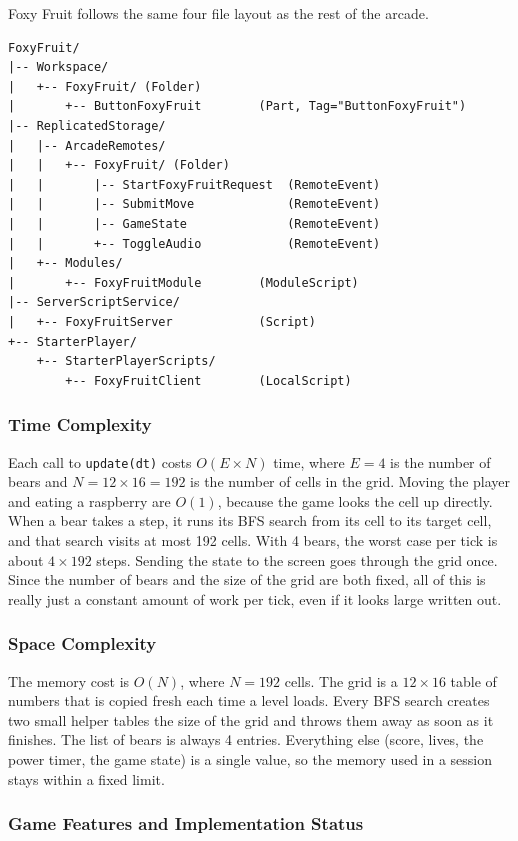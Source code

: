 \documentclass[12pt,letterpaper]{article}
\begin{document}
Foxy Fruit follows the same four file layout as the rest of the arcade.

\begin{lstlisting}
FoxyFruit/
|-- Workspace/
|   +-- FoxyFruit/ (Folder)
|       +-- ButtonFoxyFruit        (Part, Tag="ButtonFoxyFruit")
|-- ReplicatedStorage/
|   |-- ArcadeRemotes/
|   |   +-- FoxyFruit/ (Folder)
|   |       |-- StartFoxyFruitRequest  (RemoteEvent)
|   |       |-- SubmitMove             (RemoteEvent)
|   |       |-- GameState              (RemoteEvent)
|   |       +-- ToggleAudio            (RemoteEvent)
|   +-- Modules/
|       +-- FoxyFruitModule        (ModuleScript)
|-- ServerScriptService/
|   +-- FoxyFruitServer            (Script)
+-- StarterPlayer/
    +-- StarterPlayerScripts/
        +-- FoxyFruitClient        (LocalScript)
\end{lstlisting}

\subsubsection{Time Complexity}

Each call to \texttt{update(dt)} costs $O(E \times N)$ time, where $E = 4$ is the number of bears and $N = 12 \times 16 = 192$ is the number of cells in the grid. Moving the player and eating a raspberry are $O(1)$, because the game looks the cell up directly. When a bear takes a step, it runs its BFS search from its cell to its target cell, and that search visits at most 192 cells. With 4 bears, the worst case per tick is about $4 \times 192$ steps. Sending the state to the screen goes through the grid once. Since the number of bears and the size of the grid are both fixed, all of this is really just a constant amount of work per tick, even if it looks large written out.

\subsubsection{Space Complexity}

The memory cost is $O(N)$, where $N = 192$ cells. The grid is a $12 \times 16$ table of numbers that is copied fresh each time a level loads. Every BFS search creates two small helper tables the size of the grid and throws them away as soon as it finishes. The list of bears is always 4 entries. Everything else (score, lives, the power timer, the game state) is a single value, so the memory used in a session stays within a fixed limit.

\subsubsection{Game Features and Implementation Status}
\end{document}

